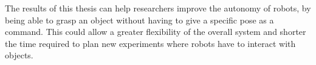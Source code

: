 The results of this thesis can help researchers improve the autonomy of robots, by being able to grasp an object without having to give a specific pose as a command. This could allow a greater flexibility of the overall system and shorter the time required to plan new experiments where robots have to interact with objects.
%
%
%
%
%
